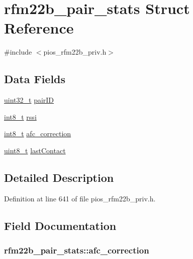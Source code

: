 \hypertarget{structrfm22b__pair__stats}{\section{rfm22b\-\_\-pair\-\_\-stats Struct Reference}
\label{structrfm22b__pair__stats}
}


{\ttfamily \#include $<$pios\-\_\-rfm22b\-\_\-priv.\-h$>$}

\subsection*{Data Fields}
\begin{DoxyCompactItemize}
\item 
\hyperlink{stdint_8h_a435d1572bf3f880d55459d9805097f62}{uint32\-\_\-t} \hyperlink{structrfm22b__pair__stats_aecbce2c6a0ece945bc66e3fc007a25e2}{pair\-I\-D}
\item 
\hyperlink{stdint_8h_ad566f6541e98b74246db1a3a3a85ad49}{int8\-\_\-t} \hyperlink{structrfm22b__pair__stats_a44c32f693c666d5f5e1d0bef314f47d7}{rssi}
\item 
\hyperlink{stdint_8h_ad566f6541e98b74246db1a3a3a85ad49}{int8\-\_\-t} \hyperlink{structrfm22b__pair__stats_a370cbe1c41f8039f09e8f8f30d59591b}{afc\-\_\-correction}
\item 
\hyperlink{stdint_8h_aba7bc1797add20fe3efdf37ced1182c5}{uint8\-\_\-t} \hyperlink{structrfm22b__pair__stats_a54401550bc26e4923636667ba5df8d34}{last\-Contact}
\end{DoxyCompactItemize}


\subsection{Detailed Description}


Definition at line 641 of file pios\-\_\-rfm22b\-\_\-priv.\-h.



\subsection{Field Documentation}
\hypertarget{structrfm22b__pair__stats_a370cbe1c41f8039f09e8f8f30d59591b}{
\subsubsection[{afc\-\_\-correction}]{ rfm22b\-\_\-pair\-\_\-stats\-::afc\-\_\-correction}}\label{structrfm22b__pair__stats_a370cbe1c41f8039f09e8f8f30d59591b}


